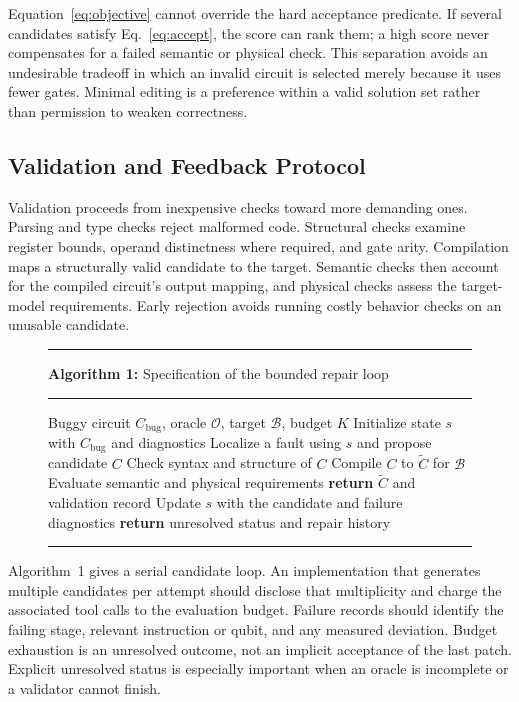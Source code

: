 \documentclass[conference]{IEEEtran}
\begin{document}
Equation~\ref{eq:objective} cannot override the hard acceptance predicate. If several candidates satisfy Eq.~\ref{eq:accept}, the score can rank them; a high score never compensates for a failed semantic or physical check. This separation avoids an undesirable tradeoff in which an invalid circuit is selected merely because it uses fewer gates. Minimal editing is a preference within a valid solution set rather than permission to weaken correctness.

\subsection{Validation and Feedback Protocol}
Validation proceeds from inexpensive checks toward more demanding ones. Parsing and type checks reject malformed code. Structural checks examine register bounds, operand distinctness where required, and gate arity. Compilation maps a structurally valid candidate to the target. Semantic checks then account for the compiled circuit's output mapping, and physical checks assess the target-model requirements. Early rejection avoids running costly behavior checks on an unusable candidate.

\begin{figure}[t]
\begin{minipage}{\columnwidth}
\hrule\smallskip
\textbf{Algorithm 1:} Specification of the bounded repair loop
\smallskip\hrule\smallskip
\footnotesize
\begin{algorithmic}[1]
\REQUIRE Buggy circuit $C_{\mathrm{bug}}$, oracle $\mathcal O$, target $\mathcal B$, budget $K$
\STATE Initialize state $s$ with $C_{\mathrm{bug}}$ and diagnostics
  \STATE Localize a fault using $s$ and propose candidate $C$
  \STATE Check syntax and structure of $C$
    \STATE Compile $C$ to $\widetilde C$ for $\mathcal B$
    \STATE Evaluate semantic and physical requirements
      \STATE \textbf{return} $\widetilde C$ and validation record
    \ENDIF
  \ENDIF
  \STATE Update $s$ with the candidate and failure diagnostics
\ENDFOR
\STATE \textbf{return} unresolved status and repair history
\end{algorithmic}
\smallskip\hrule
\end{minipage}
\end{figure}

Algorithm~1 gives a serial candidate loop. An implementation that generates multiple candidates per attempt should disclose that multiplicity and charge the associated tool calls to the evaluation budget. Failure records should identify the failing stage, relevant instruction or qubit, and any measured deviation. Budget exhaustion is an unresolved outcome, not an implicit acceptance of the last patch. Explicit unresolved status is especially important when an oracle is incomplete or a validator cannot finish.
\end{document}
